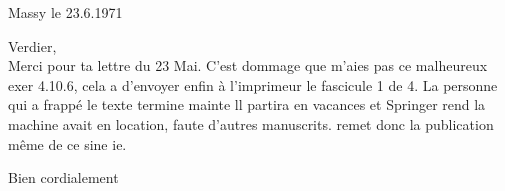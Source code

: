 \begin{flushright}
Massy le 23.6.1971\\
\end{flushright}
 Verdier,\\

Merci pour ta lettre du 23 Mai. C'est dommage que   m'aies pas  ce malheureux exer 4.10.6, cela a  d'envoyer enfin à l'imprimeur le fascicule 1 de  4. La personne qui a frappé le texte termine mainte ll partira en vacances et Springer rend la machine  avait en location, faute d'autres manuscrits.  remet donc la publication même de ce  sine ie.

Bien cordialement\\

